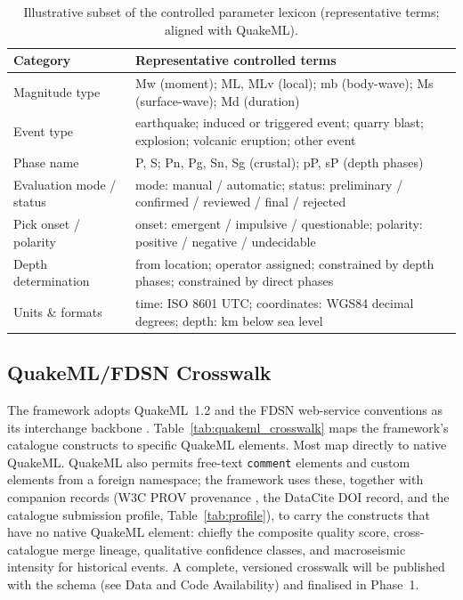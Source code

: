 \documentclass[11pt]{article}
\begin{document}
\begin{table}[H]
\centering
\small
\caption{Illustrative subset of the controlled parameter lexicon (representative terms; aligned with QuakeML).}
\label{tab:lexicon}
\setlength{\tabcolsep}{5pt}
\renewcommand{\arraystretch}{1.15}
\begin{tabular}{p{3.3cm} p{10.2cm}}
\toprule
\textbf{Category} & \textbf{Representative controlled terms} \\
\midrule
Magnitude type & \textsf{Mw} (moment); \textsf{ML}, \textsf{MLv} (local); \textsf{mb} (body-wave); \textsf{Ms} (surface-wave); \textsf{Md} (duration) \\
\addlinespace
Event type & \textsf{earthquake}; \textsf{induced or triggered event}; \textsf{quarry blast}; \textsf{explosion}; \textsf{volcanic eruption}; \textsf{other event} \\
\addlinespace
Phase name & \textsf{P}, \textsf{S}; \textsf{Pn}, \textsf{Pg}, \textsf{Sn}, \textsf{Sg} (crustal); \textsf{pP}, \textsf{sP} (depth phases) \\
\addlinespace
Evaluation mode / status & mode: \textsf{manual} / \textsf{automatic}; status: \textsf{preliminary} / \textsf{confirmed} / \textsf{reviewed} / \textsf{final} / \textsf{rejected} \\
\addlinespace
Pick onset / polarity & onset: \textsf{emergent} / \textsf{impulsive} / \textsf{questionable}; polarity: \textsf{positive} / \textsf{negative} / \textsf{undecidable} \\
\addlinespace
Depth determination & \textsf{from location}; \textsf{operator assigned}; \textsf{constrained by depth phases}; \textsf{constrained by direct phases} \\
\addlinespace
Units \& formats & time: ISO 8601 UTC; coordinates: WGS84 decimal degrees; depth: km below sea level \\
\bottomrule
\end{tabular}
\end{table}

\subsection{QuakeML/FDSN Crosswalk}
\label{sec:crosswalk}
The framework adopts QuakeML~1.2 and the FDSN web-service conventions as its interchange backbone \citep{QuakeML}. Table~\ref{tab:quakeml_crosswalk} maps the framework's catalogue constructs to specific QuakeML elements. Most map directly to native QuakeML. QuakeML also permits free-text \texttt{comment} elements and custom elements from a foreign namespace; the framework uses these, together with companion records (W3C PROV provenance \citep{PROVO}, the DataCite DOI record, and the catalogue submission profile, Table~\ref{tab:profile}), to carry the constructs that have no native QuakeML element: chiefly the composite quality score, cross-catalogue merge lineage, qualitative confidence classes, and macroseismic intensity for historical events. A complete, versioned crosswalk will be published with the schema (see Data and Code Availability) and finalised in Phase~1.
\end{document}
